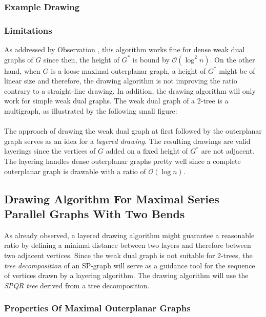 \subsubsection{Example Drawing}


\subsubsection{Limitations}

As addressed by Observation %
, this algorithm works fine for dense weak dual graphs of $G$ since then, the height of $G^*$ is bound by $\mathcal{O}(\log^2 n)$. On the other hand, when $G$ is a loose maximal outerplanar graph, a height of $G^*$ might be of linear size and therefore, the drawing algorithm is not improving the ratio contrary to a straight-line drawing. In addition, the drawing algorithm will only work for simple weak dual graphs. The weak dual graph of a 2-tree is a multigraph, as illustrated by the following small figure:\\
\\
The approach of drawing the weak dual graph at first followed by the outerplanar graph serves as an idea for a \emph{layered drawing}. The resulting drawings are valid layerings since the vertices of $G$ added on a fixed height of $G^*$ are not adjacent. The layering handles dense outerplanar graphs pretty well since a complete outerplanar graph is drawable with a ratio of $\mathcal{O}(\log n)$. 

\subsection{Drawing Algorithm For Maximal Series Parallel Graphs With Two Bends}

As already observed, a layered drawing algorithm might guarantee a reasonable ratio by defining a minimal distance between two layers and therefore between two adjacent vertices. Since the weak dual graph is not suitable for 2-trees, the \emph{tree decomposition} of an SP-graph will serve as a guidance tool for the sequence of vertices drawn by a layering algorithm. The drawing algorithm will use the \emph{SPQR tree} derived from a tree decomposition.

\subsubsection{Properties Of Maximal Outerplanar Graphs}

